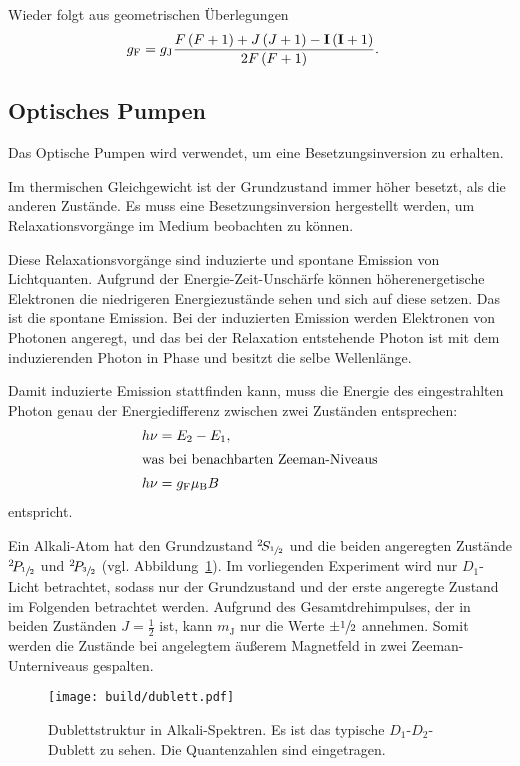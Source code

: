 Wieder folgt aus geometrischen Überlegungen
\begin{align}
  \label{eq:g_f}
  g_\text{F} &= g_\text{J} \frac{%
    F \left(F + 1\right) + J\left(J + 1\right) - \mathbf{I} \left(\mathbf{I} + 1\right)
  }{2 F \left(F + 1\right)}.
\end{align}


\subsection{Optisches Pumpen}%
\label{sub:optisches_pumpen}

Das Optische Pumpen wird verwendet, um eine Besetzungsinversion zu erhalten.

Im thermischen Gleichgewicht ist der Grundzustand immer höher besetzt, als die
anderen Zustände.
Es muss eine Besetzungsinversion hergestellt werden, um Relaxationsvorgänge im
Medium beobachten zu können.

Diese Relaxationsvorgänge sind induzierte und spontane Emission von
Lichtquanten.
Aufgrund der Energie-Zeit-Unschärfe können höherenergetische Elektronen die
niedrigeren Energiezustände sehen und sich auf diese setzen.
Das ist die spontane Emission.
Bei der induzierten Emission werden Elektronen von Photonen angeregt,
und das bei der Relaxation entstehende Photon ist mit dem induzierenden Photon
in Phase und besitzt die selbe Wellenlänge.

Damit induzierte Emission stattfinden kann, muss die Energie des eingestrahlten Photon
genau der Energiedifferenz zwischen zwei Zuständen entsprechen:
\begin{align}
  h \nu &= E_2 - E_1, \\
  \intertext{was bei benachbarten Zeeman-Niveaus}
  \label{eq:zeeman_energie}
  h \nu &= g_\text{F} \mu_\text{B} B
\end{align}
entspricht.

Ein Alkali-Atom hat den Grundzustand
${}^2\!S_{\sfrac{1}{2}}$
und die beiden angeregten Zustände
${}^2\!P_{\sfrac{1}{2}}$
und
${}^2\!P_{\sfrac{3}{2}}$
(vgl. Abbildung~\ref{fig:dublett}).
Im vorliegenden Experiment wird nur $D_1$-Licht betrachtet,
sodass nur der Grundzustand und der erste angeregte Zustand im Folgenden
betrachtet werden.
Aufgrund des Gesamtdrehimpulses, der in beiden Zuständen $J = \frac{1}{2}$ ist,
kann $m_\text{J}$ nur die Werte $\pm\sfrac{1}{2}$ annehmen.
Somit werden die Zustände bei angelegtem äußerem Magnetfeld in zwei
Zeeman-Unterniveaus gespalten.

\begin{figure}[ht]
  \centering
  \texttt{[image: build/dublett.pdf]}
  \caption{%
    Dublettstruktur in Alkali-Spektren.\cite{anleitung}
    Es ist das typische $D_1$-$D_2$-Dublett zu sehen.
    Die Quantenzahlen sind eingetragen.
  }%
  \label{fig:dublett}
\end{figure}

